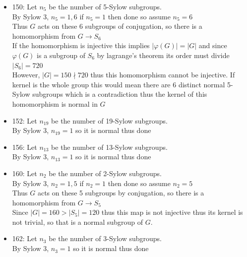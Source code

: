 \documentclass[12pt,letterpaper]{article}
\theoremstyle{definition}
\begin{document}
\begin{itemize}
    Thus G acts on these 4 left cosets by left multiplication, so there is a homomorphism from $G \rightarrow S_4$\\
    Since $|G|=144 > |S_4| =24$ thus this map is not inejective thus its kernel is not trivial so that is a normal subgroup of $G$.
    \item 150:
    Let $n_5$ be the number of 5-Sylow subgroups.\\
    By Sylow 3, $n_5=1,6$ if $n_5=1$ then done so assume $n_5=6$\\
    Thus $G$ acts on these 6 subgroups of conjugation, so there is a homomorphism from $G \rightarrow S_6$\\
    If the homomorphism is injective this implies $|\varphi(G)|=|G|$ and since $\varphi(G)$ is a subgroup of $S_6$ by lagrange's theorem its order must divide $|S_6|=720$\\
    However, $|G|=150 \nmid 720$ thus this homomorphism cannot be injective. If kernel is the whole group this would mean there are 6 distinct normal 5-Sylow subgroups which is a contradiction thus the kernel of this homomorphism is normal in $G$
    \item 152:
    Let $n_{19}$ be the number of 19-Sylow subgroups.\\
    By Sylow 3, $n_{19}=1$ so it is normal thus done
    \item 156:
    Let $n_{13}$ be the number of 13-Sylow subgroups.\\
    By Sylow 3, $n_{13}=1$ so it is normal thus done
    \item 160:
    Let $n_2$ be the number of 2-Sylow subgroups.\\
    By Sylow 3, $n_2=1,5$ if $n_2=1$ then done so assume $n_2=5$\\
    Thus $G$ acts on these 5 subgroups by conjugation, so there is a homomorphism from $G \rightarrow S_5$\\
    Since $|G|=160 > |S_5|=120$ thus this map is not injective thus its kernel is not trivial, so that is a normal subgroup of $G$.
    \item 162:
    Let $n_3$ be the number of 3-Sylow subgroups.\\
    By Sylow 3, $n_3=1$ so it is normal thus done
\end{itemize}
\end{document}
